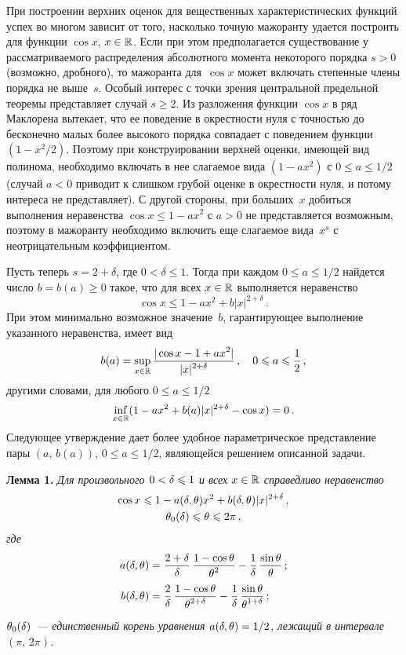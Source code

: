 \begin{multicols}{2}
При построении верхних оценок для вещественных характеристических
функций успех во многом зависит от того, насколько точную мажоранту
удается построить для функции $\cos x$, $x\in\mathbb R$. Если при этом
предполагается существование у рас\-смат\-ри\-ва\-емо\-го распределения
абсолютного момента некоторого порядка $s>0$ (возможно, дробного), то
мажоранта для~$\cos x$ может включать степенные члены порядка не
выше~$s$. Особый интерес с точки зрения центральной предельной
теоремы пред\-став\-ля\-ет случай $s\ge 2$. Из разложения функции
$\cos x$ в ряд Маклорена вытекает, что ее поведение в окрест\-ности
нуля с точностью до бесконечно малых более высокого порядка
совпадает с поведением функции $(1-x^2/2)$. Поэтому при
конструировании верхней оценки, имеющей вид полинома, необходимо
включать в нее слагаемое вида $(1-ax^2)$ с $0\le a\le1/2$ (случай
$a<0$ приводит к слишком грубой оценке в окрестности нуля, и потому
интереса не представляет). С другой стороны, при больших~$x$
добиться выполнения неравенства $\cos x\le 1-ax^2$ с $a>0$ не
представляется возможным, поэтому в мажоранту необходимо включить
еще слагаемое вида~$x^s$ с неотрицательным коэффициентом.

Пусть теперь $s=2+\delta$, где $0<\delta\le1$. Тогда при каждом
$0\le a\le1/2$ найдется число $b=b(a)\ge 0$ такое, что для всех
$x\in\mathbb R$ выполняется неравенство
$$
\cos x\le 1-ax^2+b|x|^{2+\delta}\,.
$$
При этом минимально возможное значение~$b$, гарантирующее выполнение
указанного неравенства, имеет вид
$$
b(a)=\sup_{x\in\mathbb R}\displaystyle\frac{\displaystyle |\cos x-1+ax^2|\mathstrut}{\displaystyle |x|^{2+\delta}\mathstrut}\,,\quad 0\leqslant
a\leqslant \displaystyle\frac{\displaystyle 1\mathstrut}{\displaystyle 2\mathstrut}\,,
$$
другими словами, для любого $0\le a\le1/2$
$$
\inf_{x\in\mathbb R}(1-ax^2+b(a)|x|^{2+\delta}-\cos x)=0\,.
$$
Следующее утверждение дает более удобное параметрическое
представление пары ${(a,\,b(a))}$, ${0\le a\le 1/2}$, являющейся
решением описанной задачи.

\medskip

\noindent
\textbf{Лемма 1.}
\textit{Для произвольного $0<\delta\leqslant1$ и всех $x\in\mathbb R$ справедливо неравенство}
\begin{multline}
\label{OcenkaCos}
\cos x\leqslant1-a(\delta,\theta)x^2+b(\delta,\theta)|x|^{2+\delta}\,, \\
\theta_0(\delta)\leqslant\theta\leqslant 2\pi\,,
\end{multline}
\textit{где}
\begin{align}
    a(\delta,\theta)&=\displaystyle\frac{\displaystyle 2+\delta\mathstrut}{\displaystyle \delta\mathstrut}\,\displaystyle\frac{\displaystyle 1-\cos \theta\mathstrut}{\displaystyle \theta^2\mathstrut}-
    \displaystyle\frac{\displaystyle 1\mathstrut}{\displaystyle \delta\mathstrut}\,\displaystyle\frac{\displaystyle \sin \theta\mathstrut}{\displaystyle \theta\mathstrut}\,;\label{CosA}\\
    b(\delta,\theta)&=\displaystyle\frac{\displaystyle 2\mathstrut}{\displaystyle \delta\mathstrut}\,\displaystyle\frac{\displaystyle 1-\cos \theta\mathstrut}{\displaystyle \theta^{2+\delta}\mathstrut}-
    \displaystyle\frac{\displaystyle 1\mathstrut}{\displaystyle \delta\mathstrut}\,\displaystyle\frac{\displaystyle \sin\theta\mathstrut}{\displaystyle \theta^{1+\delta}\mathstrut}\,;\label{CosB}
\end{align}
\textit{$\theta_0(\delta)$~--- единственный корень уравнения $a(\delta,\theta)=1/2$,
лежащий в интервале $(\pi,\,2\pi)$.}
\medskip


\end{multicols}
